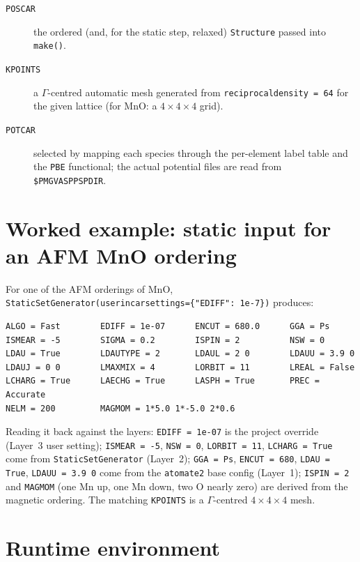 \documentclass[11pt]{article}
\newcommand{\code}[1]{\texttt{\def\_{\textunderscore\allowbreak}#1}}
\begin{document}
\begin{description}
  \item[\code{POSCAR}] the ordered (and, for the static step, relaxed)
        \code{Structure} passed into \code{make()}.
  \item[\code{KPOINTS}] a $\Gamma$-centred automatic mesh generated from
        \code{reciprocal\_density = 64} for the given lattice (for MnO: a
        $4\times4\times4$ grid).
  \item[\code{POTCAR}] selected by mapping each species through the per-element
        label table and the \code{PBE\_54} functional; the actual potential
        files are read from \code{\$PMG\_VASP\_PSP\_DIR}.
\end{description}

\section{Worked example: static input for an AFM MnO ordering}

For one of the AFM orderings of MnO, \code{StaticSetGenerator(user\_incar\_settings=\{"EDIFF":\,1e-7\})}
produces:

\begin{lstlisting}[style=incar]
ALGO = Fast        EDIFF = 1e-07      ENCUT = 680.0      GGA = Ps
ISMEAR = -5        SIGMA = 0.2        ISPIN = 2          NSW = 0
LDAU = True        LDAUTYPE = 2       LDAUL = 2 0        LDAUU = 3.9 0
LDAUJ = 0 0        LMAXMIX = 4        LORBIT = 11        LREAL = False
LCHARG = True      LAECHG = True      LASPH = True       PREC = Accurate
NELM = 200         MAGMOM = 1*5.0 1*-5.0 2*0.6
\end{lstlisting}

\noindent Reading it back against the layers: \code{EDIFF = 1e-07} is the project
override (Layer~3 user setting); \code{ISMEAR = -5}, \code{NSW = 0},
\code{LORBIT = 11}, \code{LCHARG = True} come from \code{StaticSetGenerator}
(Layer~2); \code{GGA = Ps}, \code{ENCUT = 680}, \code{LDAU = True},
\code{LDAUU = 3.9\,0} come from the \code{atomate2} base config (Layer~1);
\code{ISPIN = 2} and \code{MAGMOM} (one Mn up, one Mn down, two O nearly zero)
are derived from the magnetic ordering. The matching \code{KPOINTS} is a
$\Gamma$-centred $4\times4\times4$ mesh.

\section{Runtime environment}
\end{document}
